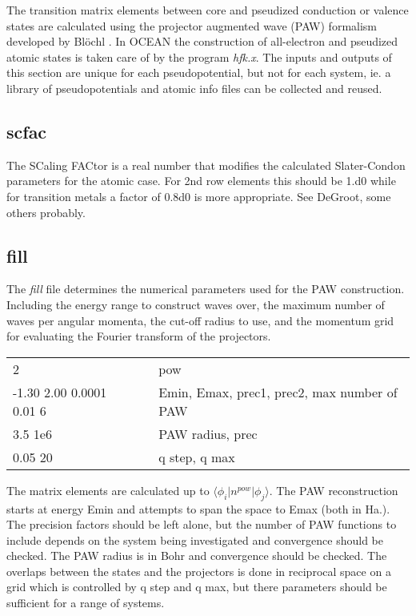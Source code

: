 \documentclass[12pt]{revtex4}
\begin{document}
The transition matrix elements between core and pseudized conduction or valence states are calculated 
using the projector augmented wave (PAW) formalism developed by Bl\"{o}chl \cite{Bloechl}. In OCEAN
the construction of all-electron and pseudized atomic states is taken care of by the program \emph{hfk.x}. 
The inputs and outputs of this section are unique for each pseudopotential, but not for each system, ie. 
a library of pseudopotentials and atomic info files can be collected and reused.

\subsection{scfac}
The SCaling FACtor is a real number that modifies the calculated Slater-Condon parameters for the atomic case. For 2nd row elements this should be 1.d0 while for transition metals a factor of 0.8d0 is more appropriate. See DeGroot, some others probably.

\subsection{fill}
The \emph{fill} file determines the numerical parameters used for the PAW construction. Including the energy range to construct waves over, the maximum number of waves per angular momenta, the cut-off radius to use, and the momentum grid for evaluating the Fourier transform of the projectors. 

\begin{center}
\begin{tabular}{| l | c l |}
\hline
2						& &  pow \\
-1.30 2.00 0.0001 0.01 6		& & Emin, Emax, prec1, prec2, max number of PAW \\
3.5 1e6					& & PAW radius, prec \\
0.05 20					& & q step, q max \\
\hline
\end{tabular}
\end{center}

The matrix elements are calculated up to $\langle \phi_i \vert n^{pow} \vert \phi_j \rangle$. The PAW reconstruction starts at energy Emin and attempts to span the space to Emax (both in Ha.). The precision factors should be left alone, but the number of PAW functions to include depends on the system being investigated and convergence should be checked. The PAW radius is in Bohr and convergence should be checked. The overlaps between the states and the projectors is done in reciprocal space on a grid which is controlled by q step and q max, but there parameters should be sufficient for a range of systems.
\end{document}
